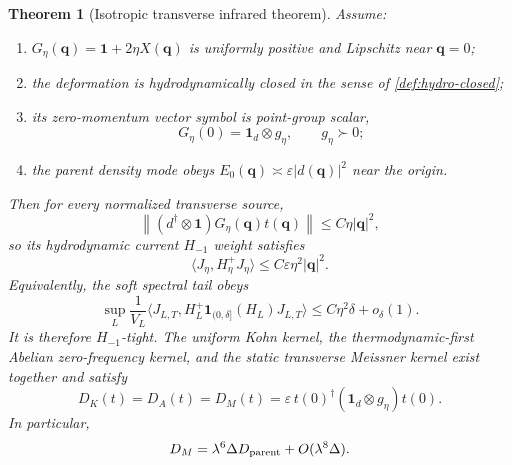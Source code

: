 \documentclass[11pt]{article}
\newtheorem{theorem}{Theorem}[section]
\theoremstyle{definition}
\theoremstyle{remark}
\newcommand{\Id}{\mathbf 1}
\newcommand{\norm}[1]{\left\lVert #1\right\rVert}
\newcommand{\abs}[1]{\left\lvert #1\right\rvert}
\newcommand{\eps}{\varepsilon}
\newcommand{\bq}{\bm q}
\begin{document}
\begin{theorem}[Isotropic transverse infrared theorem]
\label{thm:isotropic}
Assume:
\begin{enumerate}
\item $G_\eta(\bq)=\Id+2\eta X(\bq)$ is uniformly positive and Lipschitz near
$\bq=0$;
\item the deformation is hydrodynamically closed in the sense of
\cref{def:hydro-closed};
\item its zero-momentum vector symbol is point-group scalar,
\begin{equation}
 G_\eta(0)=\Id_d\otimes g_\eta,
 \qquad g_\eta\succ0;
 \label{eq:pointgroup-scalar}
\end{equation}
\item the parent density mode obeys
$E_0(\bq)\asymp\eps\abs{d(\bq)}^2$ near the origin.
\end{enumerate}
Then for every normalized transverse source,
\begin{equation}
 \norm{(d^\dagger\otimes\Id)G_\eta(\bq)t(\bq)}
 \le C\eta\abs{\bq}^2,
 \label{eq:q2-mixing}
\end{equation}
so its hydrodynamic current $H_{-1}$ weight satisfies
\begin{equation}
 \langle J_\eta,H_\eta^+J_\eta\rangle
 \le C\eps\eta^2\abs{\bq}^2.
 \label{eq:hminusone-q2}
\end{equation}
Equivalently, the soft spectral tail obeys
\begin{equation}
 \sup_L\frac1{V_L}
 \langle J_{L,T},H_L^+\mathbf1_{(0,\delta]}(H_L)J_{L,T}\rangle
 \le C\eta^2\delta+o_\delta(1).
 \label{eq:tail-delta}
\end{equation}
It is therefore $H_{-1}$-tight.  The uniform Kohn kernel, the
thermodynamic-first Abelian zero-frequency kernel, and the static transverse
Meissner kernel exist together and satisfy
\begin{equation}
 \boxed{
 D_K(t)=D_A(t)=D_M(t)
 =\eps\,t(0)^\dagger(\Id_d\otimes g_\eta)t(0).}
 \label{eq:isotropic-identification}
\end{equation}
In particular,
\begin{equation}
 D_M=\lambda^6\Delta D_{\rm parent}+O(\lambda^8\Delta).
 \label{eq:isotropic-transfer}
\end{equation}
\end{theorem}
\end{document}
